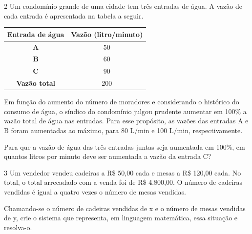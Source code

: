 \begin{escolha}
\num{2} Um condomínio grande de uma cidade tem três entradas de água. A
vazão de cada entrada é apresentada na tabela a seguir.

\begin{center}
\begin{tabular}{|cc}
\hline
\textbf{Entrada de água} & \multicolumn{1}{c|}{\textbf{Vazão (litro/minuto)}} \\ \hline
\textbf{A} & 50 \\ \hline
\textbf{B} & 60 \\ \hline
\textbf{C} & 90 \\ \hline
\textbf{Vazão total} & 200 \\ \hline
\end{tabular}
\end{center}

Em função do aumento do número de moradores e considerando o histórico
do consumo de água, o síndico do condomínio julgou prudente aumentar em
100\% a vazão total de água nas entradas. Para esse propósito,
as vazões das entradas A e B foram aumentadas ao máximo, para 80 L/min e
100 L/min, respectivamente.

Para que a vazão de água das três entradas juntas seja aumentada em
100\%, em quantos litros por minuto deve ser aumentada a vazão da entrada C?

\begin{largebox}
\end{largebox}

\num{3} Um vendedor vendeu cadeiras a R\$ 50,00 cada e mesas a R\$ 120,00
cada. No total, o total arrecadado com a venda foi de R\$ 4.800,00. O número 
de cadeiras vendidas é igual a quatro vezes o número de mesas vendidas.

Chamando-se o número de cadeiras vendidas de x e o número de mesas
vendidas de y, crie o sistema que representa, em linguagem
matemática, essa situação e resolva-o.

\begin{boxmedio}
\end{boxmedio}
\end{escolha}
